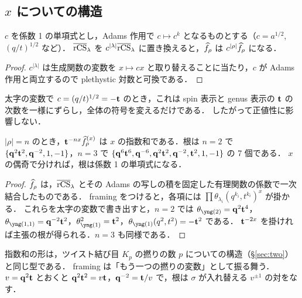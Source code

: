 \subsection{$x$ についての構造}
\begin{lemma}\label{lem:adams}
$c$ を係数 1 の単項式とし，Adams 作用で $c\mapsto c^k$ となるものとする（$c=a^{1/2}$, $(q/t)^{1/2}$ など）．
$\overline{\textrm{rCS}}_\lambda$ を $c^{|\lambda|}\overline{\textrm{rCS}}_\lambda$ に置き換えると，$\widehat{f}_\rho$ は $c^{|\rho|}\widehat{f}_\rho$ になる．
\end{lemma}
\begin{proof}
$c^{|\lambda|}$ は生成関数の変数を $x\mapsto cx$ と取り替えることに当たり，$c$ が Adams 作用と両立するので plethystic 対数と可換である．
\end{proof}
太字の変数で $c=(q/t)^{1/2}=-\mathbf{t}$ のとき，これは spin 表示と genus 表示の $\mathbf{t}$ の次数を一様にずらし，全体の符号を変えるだけである．
したがって正値性に影響しない．

\begin{proposition}\label{prop:expsum}
$|\rho|=n$ のとき，$\mathbf{t}^{-nx}\widehat{f}^{(x)}_\rho$ は $x$ の指数和である．根は
$n=2$ で $\{\mathbf{q}^2\mathbf{t}^2,\mathbf{q}^{-2},1,-1\}$，$n=3$ で $\{\mathbf{q}^6\mathbf{t}^6,\mathbf{q}^{-6},\mathbf{q}^2\mathbf{t}^2,\mathbf{q}^{-2},\mathbf{t}^2,1,-1\}$ の 7 個である．
$x$ の偶奇で分ければ，根は係数 1 の単項式になる．
\end{proposition}
\begin{proof}
$\widehat{f}_\rho$ は，$\overline{\textrm{rCS}}_\lambda$ とその Adams の写しの積を固定した有理関数の係数で一次結合したものである．
framing をつけると，各項には $\prod\theta_{\lambda_i}(q^{k_i},t^{k_i})^x$ が掛かる．
これらを太字の変数で書き出すと，$n=2$ では $\theta_{\yng(2)}=\bq^2\bt^4$，$\theta_{\yng(1,1)}=\bq^{-2}\bt^2$，$\theta_{\yng(1)}^2=\bt^2$，$\theta_{\yng(1)}(q^2,t^2)=-\bt^2$ である．
$\mathbf{t}^{-2x}$ を掛ければ主張の根が得られる．$n=3$ も同様である．
\end{proof}

指数和の形は，ツイスト結び目 $K_p$ の撚りの数 $p$ についての構造（\S\ref{sec:two}）と同じ型である．
framing は「もう一つの撚りの変数」として振る舞う．
$v=\mathbf{q}^2\mathbf{t}$ とおくと $\mathbf{q}^2\mathbf{t}^2=v\mathbf{t}$，$\mathbf{q}^{-2}=\mathbf{t}/v$ で，根は $\sigma$ が入れ替える $v^{\pm1}$ の対をなす．


